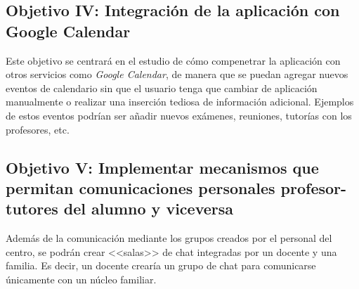 \subsection{Objetivo IV: Integración de la aplicación con Google Calendar}
Este objetivo se centrará en el estudio de cómo compenetrar la aplicación con otros servicios como \textit{Google Calendar}, de manera que se puedan agregar nuevos eventos de calendario sin que el usuario tenga que cambiar de aplicación manualmente o realizar una inserción tediosa de información adicional. Ejemplos de estos eventos podrían ser añadir nuevos exámenes, reuniones, tutorías con los profesores, etc.

\subsection{Objetivo V: Implementar mecanismos que permitan comunicaciones personales profesor-tutores del alumno y viceversa}
Además de la comunicación mediante los grupos creados por el personal del centro, se podrán crear <<salas>> de chat integradas por un docente y una familia. Es decir, un docente crearía un grupo de chat para comunicarse únicamente con un núcleo familiar.

